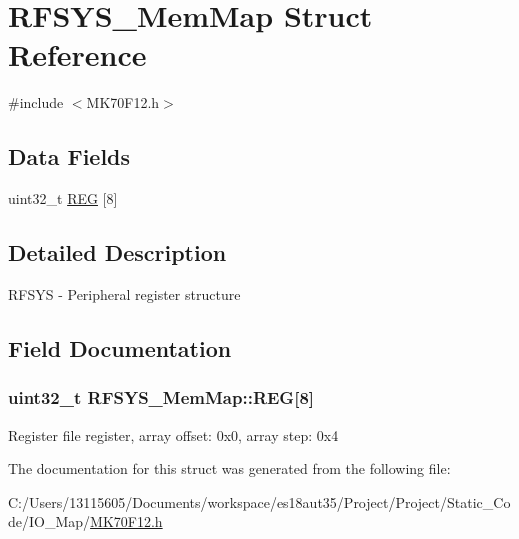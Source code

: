 \hypertarget{struct_r_f_s_y_s___mem_map}{}\section{R\+F\+S\+Y\+S\+\_\+\+Mem\+Map Struct Reference}
\label{struct_r_f_s_y_s___mem_map}


{\ttfamily \#include $<$M\+K70\+F12.\+h$>$}

\subsection*{Data Fields}
\begin{DoxyCompactItemize}
\item 
uint32\+\_\+t \hyperlink{struct_r_f_s_y_s___mem_map_a9ecc7686e575e2e1570cf50aa3234276}{R\+E\+G} \mbox{[}8\mbox{]}
\end{DoxyCompactItemize}


\subsection{Detailed Description}
R\+F\+S\+Y\+S -\/ Peripheral register structure 

\subsection{Field Documentation}
\hypertarget{struct_r_f_s_y_s___mem_map_a9ecc7686e575e2e1570cf50aa3234276}{}
\subsubsection[{R\+E\+G}]{\setlength{\rightskip}{0pt plus 5cm}uint32\+\_\+t R\+F\+S\+Y\+S\+\_\+\+Mem\+Map\+::\+R\+E\+G\mbox{[}8\mbox{]}}\label{struct_r_f_s_y_s___mem_map_a9ecc7686e575e2e1570cf50aa3234276}
Register file register, array offset\+: 0x0, array step\+: 0x4 

The documentation for this struct was generated from the following file\+:\begin{DoxyCompactItemize}
\item 
C\+:/\+Users/13115605/\+Documents/workspace/es18aut35/\+Project/\+Project/\+Static\+\_\+\+Code/\+I\+O\+\_\+\+Map/\hyperlink{_m_k70_f12_8h}{M\+K70\+F12.\+h}\end{DoxyCompactItemize}
